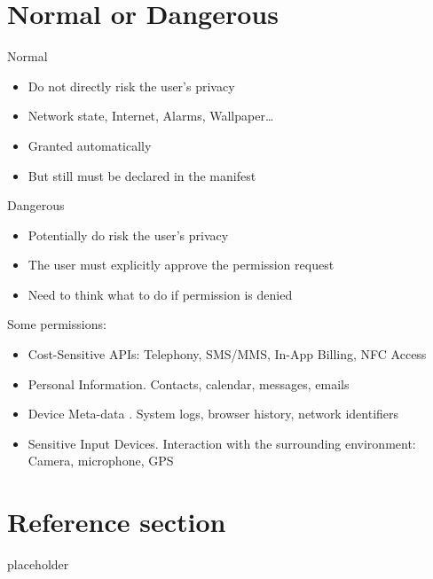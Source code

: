\documentclass{article}
\begin{document}
\section{Normal or Dangerous}
\begin{flushleft}
Normal
\begin{itemize}
  \item Do not directly risk the user’s privacy 
  \item Network state, Internet, Alarms, Wallpaper… 
  \item Granted automatically 
  \item But still must be declared in the manifest
\end{itemize}
Dangerous
\begin{itemize}
  \item Potentially do risk the user’s privacy 
  \item The user must explicitly approve the permission request 
  \item Need to think what to do if permission is denied
\end{itemize}
Some permissions:
\begin{itemize}
  \item Cost-Sensitive APIs: Telephony, SMS/MMS, In-App Billing, NFC Access
  \item Personal Information. Contacts, calendar, messages, emails 
  \item Device Meta-data . System logs, browser history, network identifiers 
  \item Sensitive Input Devices. Interaction with the surrounding environment: Camera, microphone, GPS
\end{itemize}
\end{flushleft}

\pagebreak
\section*{Reference section} \label{sec:reference}
\begin{description}
	\item[placeholder] \hfill \\
\end{description}
\end{document}
